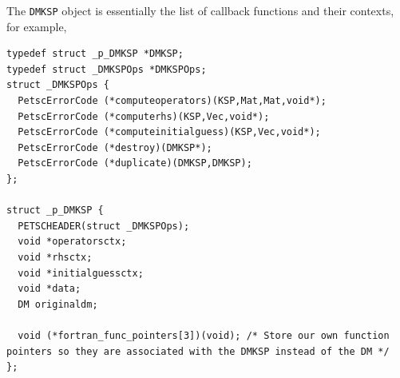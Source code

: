 The \lstinline{DMKSP} object is essentially the list of callback functions and their contexts, for example,
\begin{lstlisting}
typedef struct _p_DMKSP *DMKSP;
typedef struct _DMKSPOps *DMKSPOps;
struct _DMKSPOps {
  PetscErrorCode (*computeoperators)(KSP,Mat,Mat,void*);
  PetscErrorCode (*computerhs)(KSP,Vec,void*);
  PetscErrorCode (*computeinitialguess)(KSP,Vec,void*);
  PetscErrorCode (*destroy)(DMKSP*);
  PetscErrorCode (*duplicate)(DMKSP,DMKSP);
};

struct _p_DMKSP {
  PETSCHEADER(struct _DMKSPOps);
  void *operatorsctx;
  void *rhsctx;
  void *initialguessctx;
  void *data;
  DM originaldm;

  void (*fortran_func_pointers[3])(void); /* Store our own function pointers so they are associated with the DMKSP instead of the DM */
};
\end{lstlisting}


